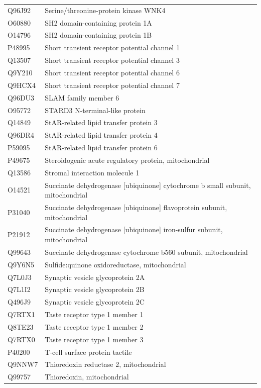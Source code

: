 \documentclass[10pt,twoside]{article}
\begin{document}
\begin{longtable}{lL{0.75\textwidth}}
Q96J92	&	Serine/threonine-protein kinase WNK4 	\\
O60880	&	SH2 domain-containing protein 1A 	\\
O14796	&	SH2 domain-containing protein 1B 	\\
P48995	&	Short transient receptor potential channel 1 	\\
Q13507	&	Short transient receptor potential channel 3 	\\
Q9Y210	&	Short transient receptor potential channel 6 	\\
Q9HCX4	&	Short transient receptor potential channel 7 	\\
Q96DU3	&	SLAM family member 6 	\\
O95772	&	STARD3 N-terminal-like protein 	\\
Q14849	&	StAR-related lipid transfer protein 3 	\\
Q96DR4	&	StAR-related lipid transfer protein 4 	\\
P59095	&	StAR-related lipid transfer protein 6 	\\
P49675	&	Steroidogenic acute regulatory protein, mitochondrial 	\\
Q13586	&	Stromal interaction molecule 1	\\
O14521	&	Succinate dehydrogenase [ubiquinone] cytochrome b small subunit, mitochondrial 	\\
P31040	&	Succinate dehydrogenase [ubiquinone] flavoprotein subunit, mitochondrial 	\\
P21912	&	Succinate dehydrogenase [ubiquinone] iron-sulfur subunit, mitochondrial 	\\
Q99643	&	Succinate dehydrogenase cytochrome b560 subunit, mitochondrial 	\\
Q9Y6N5	&	Sulfide:quinone oxidoreductase, mitochondrial 	\\
Q7L0J3	&	Synaptic vesicle glycoprotein 2A	\\
Q7L1I2	&	Synaptic vesicle glycoprotein 2B	\\
Q496J9	&	Synaptic vesicle glycoprotein 2C	\\
Q7RTX1	&	Taste receptor type 1 member 1 	\\
Q8TE23	&	Taste receptor type 1 member 2 	\\
Q7RTX0	&	Taste receptor type 1 member 3 	\\
P40200	&	T-cell surface protein tactile 	\\
Q9NNW7	&	Thioredoxin reductase 2, mitochondrial 	\\
Q99757	&	Thioredoxin, mitochondrial 	\\

\end{longtable}
\end{document}
